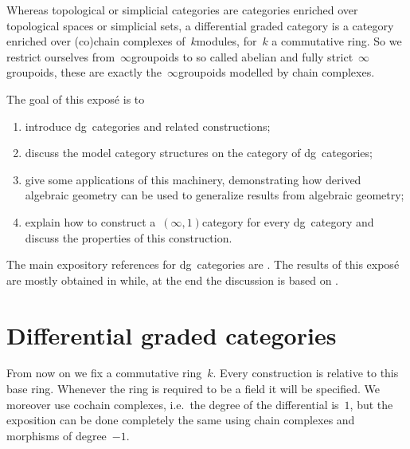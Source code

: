 Whereas topological or simplicial categories are categories enriched over topological spaces or simplicial sets, a differential graded category is a category enriched over (co)chain complexes of~$k$\dash modules, for~$k$ a commutative ring. So we restrict ourselves from~$\infty$\dash groupoids to so called abelian and fully strict~$\infty$\dash groupoids, these are exactly the~$\infty$\dash groupoids modelled by chain complexes.

The goal of this expos\'e is to
\begin{enumerate}
  \item introduce dg~categories and related constructions;
  \item discuss the model category structures on the category of dg~categories;
  \item give some applications of this machinery, demonstrating how derived algebraic geometry can be used to generalize results from algebraic geometry;
  \item explain how to construct a~$(\infty,1)$\dash category for every dg~category and discuss the properties of this construction.
\end{enumerate}

The main expository references for dg~categories are \cite{lnm2008,keller}. The results of this expos\'e are mostly obtained in \cite{toen} while, at the end the discussion is based on \cite{ha}.


\section{Differential graded categories}
From now on we fix a commutative ring~$k$. Every construction is relative to this base ring. Whenever the ring is required to be a field it will be specified. We moreover use cochain complexes, i.e.\ the degree of the differential is~$1$, but the exposition can be done completely the same using chain complexes and morphisms of degree~$-1$.

